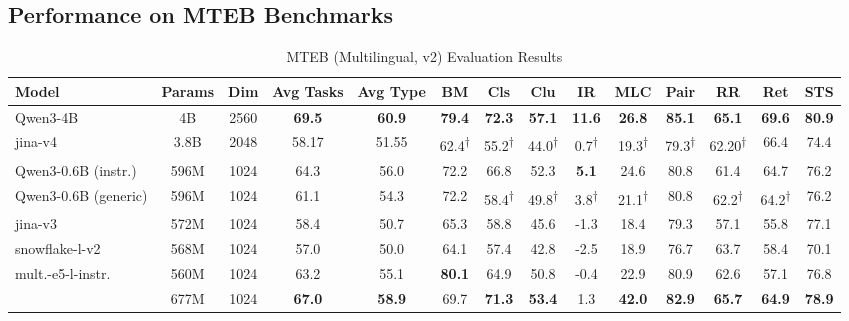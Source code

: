 \documentclass[11pt]{article}
\begin{document}
\subsection{Performance on MTEB Benchmarks}
\label{eval:mteb}
%
\begin{table}[t]
\caption{MTEB (Multilingual, v2) Evaluation Results}
\label{tab:mteb_multi_v2}
\centering
\small
\setlength{\tabcolsep}{2pt}
\begin{tabular}{@{}lccccccccccccc@{}}
\toprule
\textbf{Model} & \textbf{Params} & \textbf{Dim} & \textbf{Avg Tasks} & \textbf{Avg Type} & \textbf{BM} & \textbf{Cls} & \textbf{Clu} & \textbf{IR} & \textbf{MLC} & \textbf{Pair} & \textbf{RR} & \textbf{Ret} & \textbf{STS} \\
\midrule
Qwen3-4B                & 4B    & 2560 & \textbf{69.5} & \textbf{60.9} & \textbf{79.4} & \textbf{72.3} & \textbf{57.1} & \textbf{11.6} & \textbf{26.8} & \textbf{85.1} & \textbf{65.1} & \textbf{69.6} & \textbf{80.9} \\
jina-v4                          & 3.8B  & 2048 & 58.17            & 51.55            & 62.4\textsuperscript{†}          & 55.2\textsuperscript{†}          & 44.0\textsuperscript{†}          & 0.7\textsuperscript{†}            & 19.3\textsuperscript{†}          & 79.3\textsuperscript{†}          & 62.20\textsuperscript{†}            & 66.4          & 74.4          \\
\midrule
Qwen3-0.6B (instr.)              & 596M  & 1024 & 64.3 & 56.0 & 72.2 & 66.8 & 52.3 & \textbf{5.1} & 24.6 & 80.8 & 61.4 & 64.7 & 76.2 \\
Qwen3-0.6B (generic)             & 596M  & 1024 & 61.1 & 54.3 & 72.2 & 58.4\textsuperscript{†} & 49.8\textsuperscript{†} & 3.8\textsuperscript{†}          & 21.1\textsuperscript{†} & 80.8 & 62.2\textsuperscript{†} & 64.2\textsuperscript{†} & 76.2 \\
jina-v3                          & 572M  & 1024 & 58.4 & 50.7 & 65.3 & 58.8 & 45.6 & -1.3         & 18.4 & 79.3 & 57.1 & 55.8 & 77.1 \\
snowflake-l-v2                   & 568M  & 1024 & 57.0 & 50.0 & 64.1 & 57.4 & 42.8 & -2.5         & 18.9 & 76.7 & 63.7 & 58.4 & 70.1 \\
mult.-e5-l-instr.                & 560M  & 1024 & 63.2 & 55.1 & \textbf{80.1} & 64.9 & 50.8 & -0.4 & 22.9 & 80.9 & 62.6 & 57.1 & 76.8 \\
\JEmbeddingVFiveTextSmallShort{} & 677M  & 1024 & \textbf{67.0} & \textbf{58.9} & 69.7 & \textbf{71.3} & \textbf{53.4} & 1.3 & \textbf{42.0} & \textbf{82.9} & \textbf{65.7} & \textbf{64.9} & \textbf{78.9} \\

\end{tabular}
\end{table}
\end{document}
